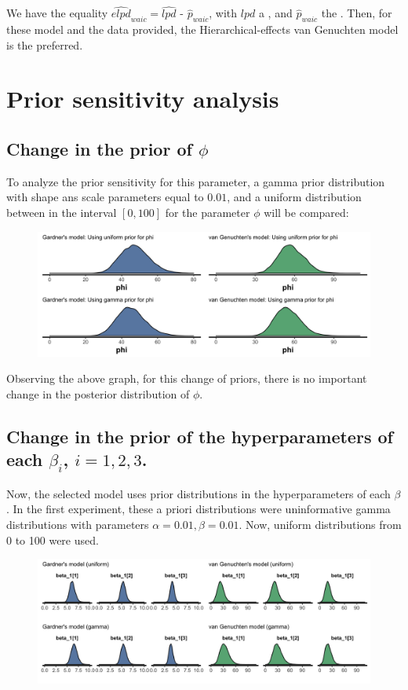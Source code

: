 \documentclass{article}
\begin{document}
We have the equality $\widehat{elpd}_{waic} = \widehat{lpd}$ - $\widehat{p}_{waic}$, with $\widehat{lpd}$ a , and $\widehat{p}_{waic}$ the . Then, for these model and the data provided, the Hierarchical-effects van Genuchten model is the preferred.


\section{Prior sensitivity analysis}

\subsection*{Change in the prior of $\phi$}
To analyze the prior sensitivity for this parameter, a gamma prior distribution with shape ans scale parameters equal to $0.01$, and a uniform distribution between in the interval $[0, 100]$ for the parameter $\phi$ will be compared:

\begin{figure}[ht!]
\centering
\includegraphics[width=13cm]{sens_1.png}
\end{figure}

Observing the above graph, for this change of priors, there is no important change in the posterior distribution of $\phi$.
\newpage
\subsection*{Change in the prior of the hyperparameters of each $\beta_i$, $i = 1,2,3$.}
Now, the selected model uses prior distributions in the hyperparameters of each $\beta$. In the first experiment, these a priori distributions were uninformative gamma distributions with parameters $\alpha = 0.01, \beta = 0.01$. Now, uniform distributions from 0 to 100 were used.

\begin{figure}[ht!]
\centering
\includegraphics[width=16cm]{sens_2.png}
\end{figure}
\end{document}
